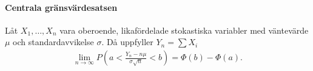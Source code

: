 \proof

\paragraph{Centrala gränsvärdesatsen}
Låt $X_1, \dots, X_n$ vara oberoende, likafördelade stokastiska variabler med väntevärde $\mu$ och standardavvikelse $\sigma$. Då uppfyller $Y_n = \sum X_i$
\begin{align*}
	\lim\limits_{n\to\infty}P\left(a < \frac{Y_n - n\mu}{\sigma\sqrt{n}} < b\right) = \Phi(b) - \Phi(a).
\end{align*}